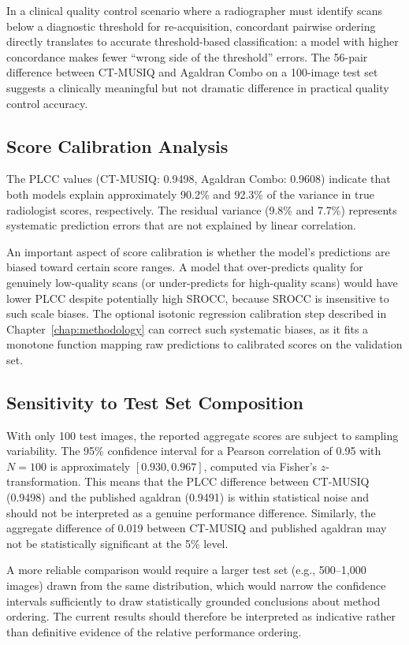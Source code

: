 In a clinical quality control scenario where a radiographer must identify scans below a
diagnostic threshold for re-acquisition, concordant pairwise ordering directly translates
to accurate threshold-based classification: a model with higher concordance makes fewer
``wrong side of the threshold'' errors. The 56-pair difference between CT-MUSIQ and
Agaldran Combo on a 100-image test set suggests a clinically meaningful but not dramatic
difference in practical quality control accuracy.

\subsection{Score Calibration Analysis}

The PLCC values (CT-MUSIQ: 0.9498, Agaldran Combo: 0.9608) indicate that both models
explain approximately 90.2\% and 92.3\% of the variance in true radiologist scores,
respectively. The residual variance (9.8\% and 7.7\%) represents systematic prediction
errors that are not explained by linear correlation.

An important aspect of score calibration is whether the model's predictions are biased
toward certain score ranges. A model that over-predicts quality for genuinely low-quality
scans (or under-predicts for high-quality scans) would have lower PLCC despite potentially
high SROCC, because SROCC is insensitive to such scale biases. The optional isotonic
regression calibration step described in Chapter~\ref{chap:methodology} can correct such
systematic biases, as it fits a monotone function mapping raw predictions to calibrated
scores on the validation set.

\subsection{Sensitivity to Test Set Composition}

With only 100 test images, the reported aggregate scores are subject to sampling
variability. The 95\% confidence interval for a Pearson correlation of 0.95 with
$N = 100$ is approximately $[0.930, 0.967]$, computed via Fisher's $z$-transformation.
This means that the PLCC difference between CT-MUSIQ (0.9498) and the published agaldran
(0.9491) is within statistical noise and should not be interpreted as a genuine
performance difference. Similarly, the aggregate difference of 0.019 between CT-MUSIQ
and published agaldran may not be statistically significant at the 5\% level.

A more reliable comparison would require a larger test set (e.g., 500--1,000 images)
drawn from the same distribution, which would narrow the confidence intervals
sufficiently to draw statistically grounded conclusions about method ordering. The
current results should therefore be interpreted as indicative rather than definitive
evidence of the relative performance ordering.


